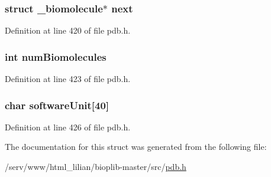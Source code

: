 \hypertarget{struct__biomolecule_aa5cc2750e98897a372b0e8a16d5f39f2}{
\subsubsection[{next}]{\setlength{\rightskip}{0pt plus 5cm}struct {\bf \-\_\-biomolecule}$\ast$ next}}\label{struct__biomolecule_aa5cc2750e98897a372b0e8a16d5f39f2}


Definition at line 420 of file pdb.\-h.

\hypertarget{struct__biomolecule_af852d0d5d1cbc23cc11727f06a626c13}{
\subsubsection[{num\-Biomolecules}]{\setlength{\rightskip}{0pt plus 5cm}int num\-Biomolecules}}\label{struct__biomolecule_af852d0d5d1cbc23cc11727f06a626c13}


Definition at line 423 of file pdb.\-h.

\hypertarget{struct__biomolecule_a40fac6adaa0a0daef077b77e041a3ba8}{
\subsubsection[{software\-Unit}]{\setlength{\rightskip}{0pt plus 5cm}char software\-Unit\mbox{[}40\mbox{]}}}\label{struct__biomolecule_a40fac6adaa0a0daef077b77e041a3ba8}


Definition at line 426 of file pdb.\-h.



The documentation for this struct was generated from the following file\-:\begin{DoxyCompactItemize}
\item 
/serv/www/html\-\_\-lilian/bioplib-\/master/src/\hyperlink{pdb_8h}{pdb.\-h}\end{DoxyCompactItemize}
